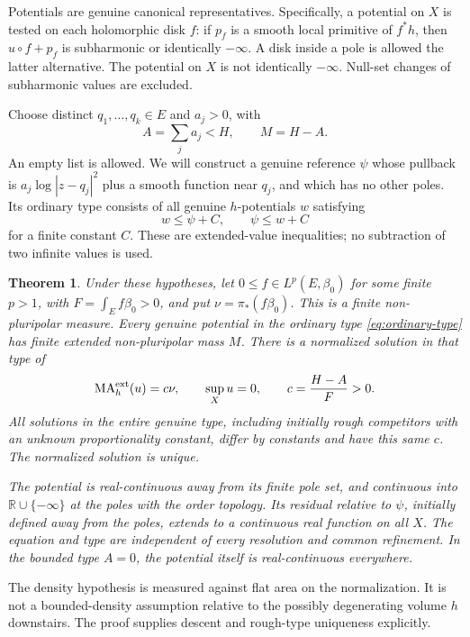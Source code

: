 \documentclass[11pt]{article}
\newtheorem{theorem}{Theorem}
\newcommand{\R}{\mathbb R}
\begin{document}
Potentials are genuine canonical representatives. Specifically, a
potential on $X$ is tested on each holomorphic disk $f$: if $p_f$ is
a smooth local primitive of $f^*h$, then $u\circ f+p_f$ is
subharmonic or identically $-\infty$. A disk inside a pole is allowed
the latter alternative. The potential on $X$ is not identically
$-\infty$. Null-set changes of subharmonic values are excluded.

Choose distinct $q_1,\ldots,q_k\in E$ and $a_j>0$, with
\[
 A=\sum_ja_j<H,\qquad M=H-A.
\]
An empty list is allowed. We will construct a genuine reference $\psi$
whose pullback is $a_j\log|z-q_j|^2$ plus a smooth function near
$q_j$, and which has no other poles. Its ordinary type consists of
all genuine $h$-potentials $w$ satisfying
\begin{equation}\label{eq:ordinary-type}
 w\leq\psi+C,
 \qquad \psi\leq w+C
\end{equation}
for a finite constant $C$. These are extended-value inequalities; no
subtraction of two infinite values is used.

\begin{theorem}\label{thm:curve}
Under these hypotheses, let $0\leq f\in L^p(E,\beta_0)$ for some
finite $p>1$, with $F=\int_Ef\beta_0>0$, and put
$\nu=\pi_*(f\beta_0)$. This is a finite non-pluripolar measure.
Every genuine potential in the ordinary type \eqref{eq:ordinary-type}
has finite extended non-pluripolar mass $M$. There is a normalized
solution in that type of
\[
 \operatorname{MA}^{\rm ext}_h(u)=c\nu,\qquad
 \sup_Xu=0,\qquad c=\frac{H-A}{F}>0.
\]
All solutions in the entire genuine type, including initially rough
competitors with an unknown proportionality constant, differ by constants
and have this same $c$. The normalized solution is unique.

The potential is real-continuous away from its finite pole set, and
continuous into $\R\cup\{-\infty\}$ at the poles with the order
topology. Its residual relative to $\psi$, initially defined away
from the poles, extends to a continuous real function on all $X$.
The equation and type are independent of every resolution and common
refinement. In the bounded type $A=0$, the potential itself is
real-continuous everywhere.
\end{theorem}

The density hypothesis is measured against flat area on the normalization.
It is not a bounded-density assumption relative to the possibly
degenerating volume $h$ downstairs. The proof supplies descent and
rough-type uniqueness explicitly.
\end{document}
